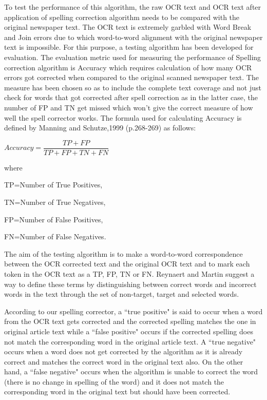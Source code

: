 \documentclass[letterpaper,11pt]{report}
\begin{document}
To test the performance of this algorithm, the raw OCR text and OCR text after application of spelling correction algorithm needs to be compared with the original newspaper text. The OCR text is extremely garbled with Word Break and Join errors due to which word-to-word alignment with the original newspaper text is impossible. For this purpose, a testing algorithm has been developed for evaluation. The evaluation metric used for measuring the performance of Spelling correction algorithm is Accuracy which requires calculation of how many OCR errors got corrected when compared to the original scanned newspaper text. The measure has been chosen so as to include the complete text coverage and not just check for words that got corrected after spell correction as in the latter case, the  number of FP and TN get missed which won't give the correct measure of how well the spell corrector works. The formula used for calculating Accuracy is defined by Manning and Schutze,1999 (p.268-269) as follows:

$Accuracy=  \dfrac{TP+FP} {TP+ FP + TN + FN}$


where 

TP=Number of True Positives,

TN=Number of True Negatives,

 FP=Number of False Positives,

 FN=Number of False Negatives. 

The aim of the testing algorithm is to make a word-to-word correspondence between the OCR corrected text and the original OCR text and to mark each token in the OCR text as a TP, FP, TN or FN. Reynaert and Martin\cite{reynaert2008all} suggest a way to define these terms by distinguishing between correct words and incorrect words in the text through the set of non-target, target and selected words.  

According to our spelling corrector, a ``true positive" is said to occur when a word from the OCR text gets corrected and the corrected spelling matches the one in original article text while a ``false positive" occurs if the corrected spelling does not match the corresponding word in the original article text. A ``true negative" occurs when a word does not get corrected by the algorithm as it is already correct and matches the correct word in the original text also. On the other hand, a ``false negative" occurs when the algorithm is unable to correct the word (there is no change in spelling of the word) and it does not match the corresponding word in the original text but should have been corrected.
\end{document}
